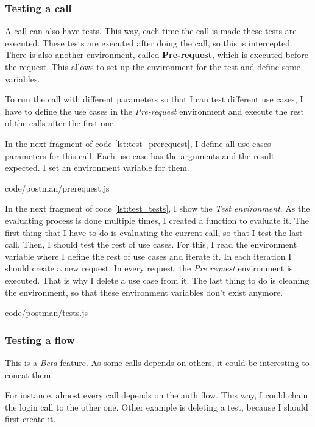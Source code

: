 \subsubsection{Testing a call}
A call can also have tests. This way, each time the call is made these tests are executed. These tests are executed after doing the call, so this is intercepted. 
There is also another environment, called \textbf{Pre-request}, which is executed before the request. This allows to set up the environment for the test and define some variables. 

To run the call with different parameters so that I can test different use cases, I have to define the use cases in the \textit{Pre-request} 
environment and execute the rest of the calls after the first one. 

In the next fragment of code \ref{lst:test_prerequest}, I define all use cases parameters for this call. Each use case has the arguments and the result expected. I set an environment variable for them.

{code/postman/prerequest.js}

In the next fragment of code \ref{lst:test_tests}, I show the \textit{Test environment}. As the evaluating process is done multiple times, 
I created a function to evaluate it. The first thing that I have to do is evaluating the current call, so that I test the last call. 
Then, I should test the rest of use cases. For this, I read the environment variable where I define the rest of use cases and iterate it. 
In each iteration I should create a new request. In every request, the \textit{Pre request} environment is executed. That is why I delete 
a use case from it. The last thing to do is cleaning the environment, so that these environment variables don't exist anymore.

{code/postman/tests.js}

\subsubsection{Testing a flow}
This is a \textit{Beta} feature. As some calls depends on others, it could be interesting to concat them. 

For instance, almost every call depends on the auth flow. This way, I could chain the login call to the other one. 
Other example is deleting a test, because I should first create it.

